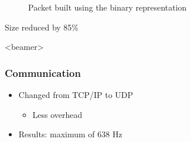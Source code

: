 \begin{frame}
\begin{figure}[h]
\begin{minipage}{.45\textwidth}
{\begin{tikzpicture}
  \end{tikzpicture}
  }
  \caption{Packet built using the binary representation}
  \label{fig:new_packets}
\end{minipage}
\end{figure}
\begin{center}
  Size reduced by 85\%
  \end{center}
\end{frame}


\begin{frame}<beamer>
\frametitle{Communication}
\begin{itemize}
	\item Changed from TCP/IP to UDP
	\begin{itemize}
	\item Less overhead
	\end{itemize}
    \item Results: maximum of 638 Hz
\end{itemize}
\end{frame}





